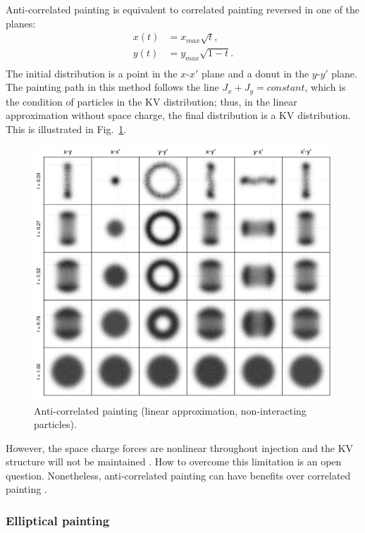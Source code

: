 Anti-correlated painting is equivalent to correlated painting reversed in one of the planes:
%
\begin{equation}
\begin{aligned}
    {x}(t) &= x_{max}\sqrt{t}, \\
    {y}(t) &= y_{max}\sqrt{1 - t}. \\
\end{aligned}
\end{equation}
%
The initial distribution is a point in the $x$-$x'$ plane and a donut in the $y$-$y'$ plane. The painting path in this method follows the line $J_x + J_y = constant$, which is the condition of particles in the KV distribution; thus, in the linear approximation without space charge, the final distribution is a KV distribution. This is illustrated in Fig.~\ref{fig:anti-correlated_painting}. 
%
\begin{figure}[!p]
    \centering
    \includegraphics[width=\textwidth]{Images/chapter1/snapshots_anticorr.png}
    \caption{Anti-correlated painting (linear approximation, non-interacting particles).}
    \label{fig:anti-correlated_painting}
\end{figure}
%
However, the space charge forces are nonlinear throughout injection and the KV structure will not be maintained \cite{Crosbie1996}. How to overcome this limitation is an open question. Nonetheless, anti-correlated painting can have benefits over correlated painting \cite{Hotchi2020}.


\subsubsection{Elliptical painting}


